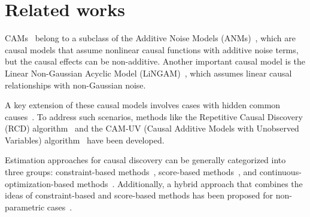 \section{Related works}
\label{sec:related_works}
CAMs~\citep{Buhlmann14CAM} belong to a subclass of the Additive Noise Models (ANMs)~\citep{Hoyer09NIPS}, which are causal models that assume nonlinear causal functions with additive noise terms, but the causal effects can be non-additive. Another important causal model is the Linear Non-Gaussian Acyclic Model (LiNGAM)~\citep{Shimizu06JMLR}, which assumes linear causal relationships with non-Gaussian noise.

A key extension of these causal models involves cases with hidden common causes~\citep{Hoyer08IJAR,Zhang10UAI-GP,Tashiro14NECO,Salehkaleybar2020learning}. To address such scenarios, methods like the Repetitive Causal Discovery (RCD) algorithm~\citep{Maeda20AISTATS} and the CAM-UV (Causal Additive Models with Unobserved Variables) algorithm~\citep{maeda21a} have been developed.

Estimation approaches for causal discovery can be generally categorized into three groups: constraint-based methods~\citep{Spirtes91PC,Spirtes95FCI}, score-based methods~\citep{Chickering2002}, and continuous-optimization-based methods~\citep{Zheng18Neurips,Bhattacharya21ABC}. Additionally, a hybrid approach that combines the ideas of constraint-based and score-based methods has been proposed for non-parametric cases~\citep{Ogarrio16Hybrid}.